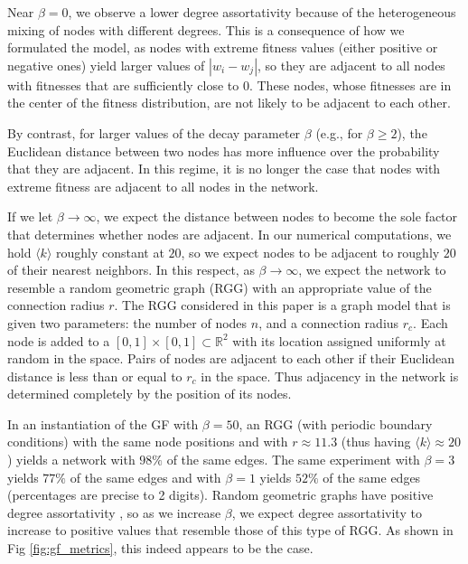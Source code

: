 \documentclass[%
 reprint,
 amsmath,amssymb,
 aps,
]{revtex4-1}
\begin{document}
Near $\beta = 0$, we observe a lower degree assortativity because of the heterogeneous mixing of nodes with different degrees. This is a consequence of how we formulated the model, as nodes with extreme fitness values (either positive or negative ones) yield larger values of $|w_i - w_j|$, so they are adjacent to all nodes with fitnesses that are sufficiently close to $0$. These nodes, whose fitnesses are in the center of the fitness distribution, are not likely to be adjacent to each other.

By contrast, for larger values of the decay parameter $\beta$ (e.g., for $\beta \geq 2$), the Euclidean distance between two nodes has more influence over the probability that they are adjacent. In this regime, it is no longer the case that nodes with extreme fitness are adjacent to all nodes in the network. 

If we let $\beta \rightarrow \infty$, we expect the distance between nodes to become the sole factor that determines whether nodes are adjacent. In our numerical computations, we hold $\langle k \rangle$ roughly constant at $20$, so we expect nodes to be adjacent to roughly $20$ of their nearest neighbors. In this respect, as $\beta \rightarrow \infty$, we expect the network to resemble a random geometric graph (RGG) \cite{penrose-rgg, rgg} with an appropriate value of the connection radius $r$. {\color{red}The RGG considered in this paper is a graph model that is given two parameters: the number of nodes $n$, and a connection radius $r_c$. Each node is added to a $[0, 1] \times [0, 1] \subset \mathbb{R}^2$ with its location assigned uniformly at random in the space. Pairs of nodes are adjacent to each other if their Euclidean distance is less than or equal to $r_c$ in the space. Thus adjacency in the network is determined completely by the position of its nodes. }

In an instantiation of the GF with $\beta=50$, an RGG (with periodic boundary conditions) with the same node positions and with $r \approx 11.3$ (thus having $\langle k \rangle \approx 20$) yields a network with $98\%$ of the same edges. {\color{red}The same experiment with $\beta=3$ yields $77\%$ of the same edges and with $\beta=1$ yields $52\%$ of the same edges (percentages are precise to 2 digits).} Random geometric graphs have positive degree assortativity \cite{rgg_correlations}, so as we increase $\beta$, we expect degree assortativity to increase to positive values that resemble those of this type of RGG. {\color{red}As shown in Fig \ref{fig:gf_metrics}, this indeed appears to be the case.}
\end{document}
